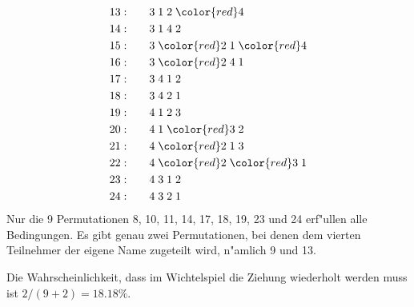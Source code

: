 \begin{loesung}
\begin{teilaufgaben}
\begin{align*}
%
13:\qquad&            3 \;            1 \;            2 \;{\color{red}4}\\
14:\qquad&            3 \;            1 \;            4 \;            2 \\
15:\qquad&            3 \;{\color{red}2}\;            1 \;{\color{red}4}\\
16:\qquad&            3 \;{\color{red}2}\;            4 \;            1 \\
17:\qquad&            3 \;            4 \;            1 \;            2 \\
18:\qquad&            3 \;            4 \;            2 \;            1 \\
%
19:\qquad&            4 \;            1 \;            2 \;            3 \\
20:\qquad&            4 \;            1 \;{\color{red}3}\;            2 \\
21:\qquad&            4 \;{\color{red}2}\;            1 \;            3 \\
22:\qquad&            4 \;{\color{red}2}\;{\color{red}3}\;            1 \\
23:\qquad&            4 \;            3 \;            1 \;            2 \\
24:\qquad&            4 \;            3 \;            2 \;            1
\end{align*}
Nur die 9 Permutationen 8, 10, 11, 14, 17, 18, 19, 23 und 24 erf"ullen
alle Bedingungen.
Es gibt genau zwei Permutationen, bei denen dem vierten Teilnehmer der
eigene Name zugeteilt wird, n"amlich 9 und 13.
\item
Die Wahrscheinlichkeit, dass im Wichtelspiel die Ziehung wiederholt 
werden muss ist $2/(9 + 2)=18.18\%$.
\end{teilaufgaben}
\end{loesung}

